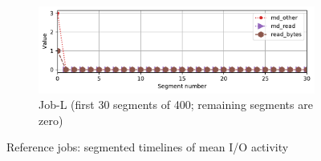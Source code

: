 \documentclass{jhps}
\begin{document}
\begin{figure}\ContinuedFloat%

\begin{subfigure}{0.8\textwidth}
\centering
\includegraphics[width=\textwidth]{job-timeseries7488914-30}
\caption{Job-L (first 30 segments of 400; remaining segments are zero)}%
\label{fig:job-L}
\end{subfigure}
\centering
\caption{Reference jobs: segmented timelines of mean I/O activity}
\end{figure}
\end{document}
